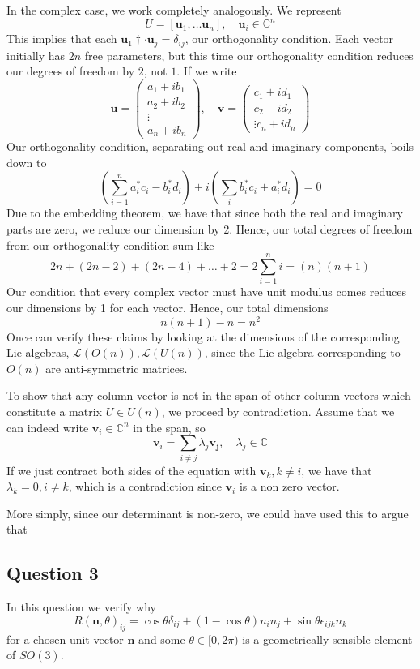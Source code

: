 \documentclass[11pt, oneside]{article}   	%
\theoremstyle{slanted}
\begin{document}
In the complex case, we work completely analogously. We represent 
\[ 
U = [ \mathbf{u}_1 , \dots \mathbf{u}_n ], \quad \mathbf{u}_i \in \mathbb{C}^n 
\] 
This implies that each $\mathbf{u}_1 \dagger \cdot \mathbf{u}_j  = \delta_{ ij}$, our orthogonality condition. Each vector initially has $2n$ free parameters, but this time our orthogonality condition reduces our degrees of freedom by $2$, not $1$. 
If we write
\[ 
\mathbf{u} = \begin{pmatrix} a_1 + i b_1 \\ 
a_2 + i b_2 \\
\vdots \\
a_n + i b_n
\end{pmatrix}, \quad \mathbf{v}  = \begin{pmatrix}
c_1 + i d_1 \\
c_2 - i d_2 \\
\vdots 
c_n + i d_n 
\end{pmatrix} 
\] Our orthogonality condition, separating out real and imaginary components, boils down to 
\[ 
\left( \sum_{i =1}^n a^*_i c_i  - b_i^* d_i \right) + i \left( \sum_i b_i^* c_i + a_i^* d_i \right) = 0 
\] 
Due to the embedding theorem, we have that since both the real and imaginary parts are zero, we reduce our dimension by 2. Hence, our total degrees of freedom from our orthogonality condition sum like 
\[ 
2n + (2n -2) + (2n - 4 ) + \dots + 2  = 2 \sum_{i = 1}^{n} i  = 
(n) ( n + 1 ) 
\] 
Our condition that every complex vector must have unit modulus comes reduces our dimensions by 1 for each vector. Hence, our total dimensions 
\[ 
n ( n + 1)  - n = n^2 
\] 
Once can verify these claims by looking at the dimensions of the corresponding Lie algebras, $\mathcal{L} ( O( n) ), \mathcal{L } ( U(n))$, since the Lie algebra corresponding to $O(n)$ are anti-symmetric matrices. 

To show that any column vector is not in the span of other column vectors which constitute a matrix $U \in U(n)$, we proceed by contradiction. Assume that we can indeed write $\mathbf{v}_i \in \mathbb{C}^n$ in the span, so\[ 
\mathbf{v}_i = \sum_{ i \neq j } \lambda_j \mathbf{v_j}, \quad \lambda_j \in \mathbb{C}
\] 
If we just contract both sides of the equation with $\mathbf{v}_k, k \neq i$, we have that $\lambda_k  = 0, i \neq k$, which is a contradiction since $\mathbf{v}_i$ is a non zero vector.

More simply, since our determinant is non-zero, we could have used this to argue 
that 

\pagebreak 
\subsection{Question 3}
In this question we verify why
\[ 
R(\mathbf{n}, \theta)_{ij} = \cos \theta \delta_{ij} + (  1 - \cos \theta )n_i n_j  + \sin \theta \epsilon_{ijk} n_k
\] 
for a chosen unit vector $\mathbf{n}$ and some $\theta \in [0, 2\pi)$ is a geometrically sensible element of $SO(3)$. 
\end{document}
